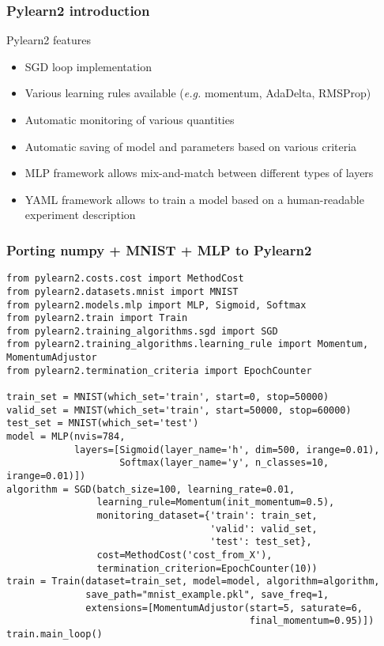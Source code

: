 \documentclass[mathserif, xcolor=dvipsnames]{beamer}
\begin{document}
\begin{frame}
    \frametitle{Pylearn2 introduction}

    \begin{block}{Pylearn2 features}
    \begin{itemize}
        \item{SGD loop implementation}
        \item{Various learning rules available (\emph{e.g.} momentum, AdaDelta,
              RMSProp)}
        \item{Automatic monitoring of various quantities}
        \item{Automatic saving of model and parameters based on various
              criteria}
        \item{MLP framework allows mix-and-match between different types of
              layers}
        \item{YAML framework allows to train a model based on a human-readable
              experiment description}
    \end{itemize}
    \end{block}
\end{frame}

\begin{frame}[fragile]
    \frametitle{Porting numpy + MNIST + MLP to Pylearn2}

    \begin{examples}
\begin{lstlisting}[caption=MNIST + MLP in Pylearn2]
from pylearn2.costs.cost import MethodCost
from pylearn2.datasets.mnist import MNIST
from pylearn2.models.mlp import MLP, Sigmoid, Softmax
from pylearn2.train import Train
from pylearn2.training_algorithms.sgd import SGD
from pylearn2.training_algorithms.learning_rule import Momentum, MomentumAdjustor
from pylearn2.termination_criteria import EpochCounter

train_set = MNIST(which_set='train', start=0, stop=50000)
valid_set = MNIST(which_set='train', start=50000, stop=60000)
test_set = MNIST(which_set='test')
model = MLP(nvis=784,
            layers=[Sigmoid(layer_name='h', dim=500, irange=0.01),
                    Softmax(layer_name='y', n_classes=10, irange=0.01)])
algorithm = SGD(batch_size=100, learning_rate=0.01,
                learning_rule=Momentum(init_momentum=0.5),
                monitoring_dataset={'train': train_set,
                                    'valid': valid_set,
                                    'test': test_set},
                cost=MethodCost('cost_from_X'),
                termination_criterion=EpochCounter(10))
train = Train(dataset=train_set, model=model, algorithm=algorithm,
              save_path="mnist_example.pkl", save_freq=1,
              extensions=[MomentumAdjustor(start=5, saturate=6,
                                           final_momentum=0.95)])
train.main_loop()
\end{lstlisting}
    \end{examples}
\end{frame}
\end{document}
